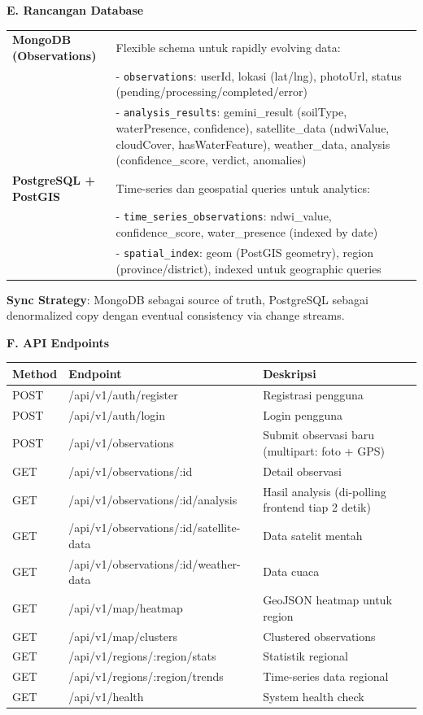\documentclass[12pt,a4paper]{article}
\newcommand{\subsectionbox}[1]{%
  \textbf{\large #1}\\[0.3cm]
}
\begin{document}
\subsectionbox{E. Rancangan Database}

\begin{tabularx}{\textwidth}{|l|X|}
  \hline
  \textbf{MongoDB (Observations)} & Flexible schema untuk rapidly evolving data: \\[0.2cm]
  & - \texttt{observations}: userId, lokasi (lat/lng), photoUrl, status (pending/processing/completed/error) \\[0.2cm]
  & - \texttt{analysis\_results}: gemini\_result (soilType, waterPresence, confidence), satellite\_data (ndwiValue, cloudCover, hasWaterFeature), weather\_data, analysis (confidence\_score, verdict, anomalies) \\[0.2cm]
  \textbf{PostgreSQL + PostGIS} & Time-series dan geospatial queries untuk analytics: \\[0.2cm]
  & - \texttt{time\_series\_observations}: ndwi\_value, confidence\_score, water\_presence (indexed by date) \\[0.2cm]
  & - \texttt{spatial\_index}: geom (PostGIS geometry), region (province/district), indexed untuk geographic queries \\
  \hline
\end{tabularx}

\textbf{Sync Strategy}: MongoDB sebagai source of truth, PostgreSQL sebagai denormalized copy dengan eventual consistency via change streams.

\subsectionbox{F. API Endpoints}

\begin{tabularx}{\textwidth}{|l|l|X|}
  \hline
  \textbf{Method} & \textbf{Endpoint} & \textbf{Deskripsi} \\
  \hline
  POST & /api/v1/auth/register & Registrasi pengguna \\
  POST & /api/v1/auth/login & Login pengguna \\
  POST & /api/v1/observations & Submit observasi baru (multipart: foto + GPS) \\
  GET & /api/v1/observations/:id & Detail observasi \\
  GET & /api/v1/observations/:id/analysis & Hasil analysis (di-polling frontend tiap 2 detik) \\
  GET & /api/v1/observations/:id/satellite-data & Data satelit mentah \\
  GET & /api/v1/observations/:id/weather-data & Data cuaca \\
  GET & /api/v1/map/heatmap & GeoJSON heatmap untuk region \\
  GET & /api/v1/map/clusters & Clustered observations \\
  GET & /api/v1/regions/:region/stats & Statistik regional \\
  GET & /api/v1/regions/:region/trends & Time-series data regional \\
  GET & /api/v1/health & System health check \\
  \hline
\end{tabularx}
\end{document}
